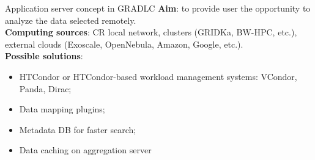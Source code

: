 
\begin{frame}{Application server concept in GRADLC}
\textbf{Aim}: to provide user the opportunity to analyze the data selected remotely.
\vspace{\itemsep}\\
\textbf{Computing sources}: CR local network, clusters (GRIDKa, BW-HPC, etc.), external clouds (Exoscale, OpenNebula, Amazon, Google, etc.).
\vspace{\itemsep}\\
\textbf{Possible solutions}:
  \begin{itemize}
    \item HTCondor or HTCondor-based workload management systems: VCondor, Panda, Dirac;
    \item Data mapping plugins;
    \item Metadata DB for faster search;
    \item Data caching on aggregation server
  \end{itemize}
\end{frame}




